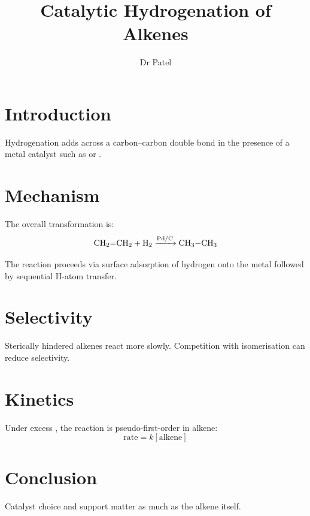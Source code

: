 \documentclass{article}
\title{Catalytic Hydrogenation of Alkenes}
\author{Dr Patel}
\begin{document}
\maketitle

\section{Introduction}
Hydrogenation adds  across a carbon--carbon double bond in the presence of a metal catalyst such as  or .

\section{Mechanism}
The overall transformation is:
\[
\ce{CH2=CH2 + H2 ->[\text{Pd/C}] CH3-CH3}
\]

The reaction proceeds via surface adsorption of hydrogen onto the metal followed by sequential H-atom transfer.

\section{Selectivity}
Sterically hindered alkenes react more slowly. Competition with isomerisation can reduce selectivity.

\section{Kinetics}
Under excess , the reaction is pseudo-first-order in alkene:
\[
\text{rate} = k[\text{alkene}]
\]

\section{Conclusion}
Catalyst choice and support matter as much as the alkene itself.
\end{document}
